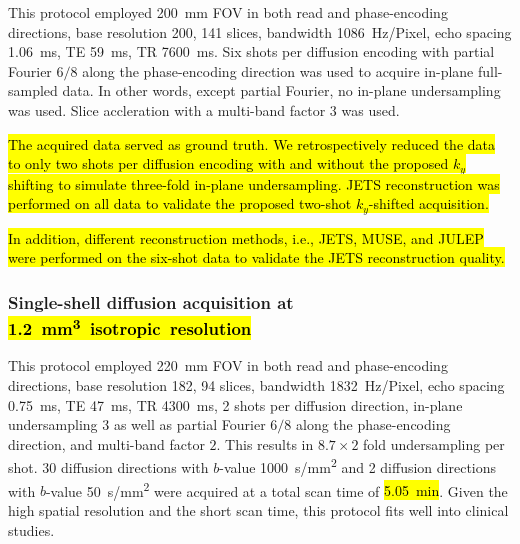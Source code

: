 \documentclass[preprint,12pt,authoryear,review]{elsarticle}
\begin{document}
    This protocol employed \SI{200}{\milli\meter} FOV
    in both read and phase-encoding directions,
    base resolution 200, 141 slices, bandwidth \SI{1086}{Hz/Pixel},
    echo spacing \SI{1.06}{ms}, TE \SI{59}{ms}, TR \SI{7600}{ms}.
    Six shots per diffusion encoding with partial Fourier $6/8$
    along the phase-encoding direction was used to
    acquire in-plane full-sampled data.
    In other words, except partial Fourier,
    no in-plane undersampling was used.
    Slice accleration with a multi-band factor $3$ was used.

    \hl{The acquired data served as ground truth.
    We retrospectively reduced the data to only two shots
    per diffusion encoding with and without the proposed $k_y$ shifting
    to simulate three-fold in-plane undersampling.
    JETS reconstruction was performed on all data to validate
    the proposed two-shot $k_y$-shifted acquisition.}

    \hl{In addition, different reconstruction methods,
    i.e., JETS, MUSE, and JULEP were performed on the six-shot data
    to validate the JETS reconstruction quality.}

    \subsubsection{Single-shell diffusion acquisition at \hl{\mbox{\SI{1.2}{\cubic\milli\meter} isotropic resolution}}} 
    \label{SEC:ACQ1.2mm}

    This protocol employed \SI{220}{\milli\meter} FOV in both read and phase-encoding directions,
    base resolution 182, 94 slices, bandwidth \SI{1832}{Hz/Pixel},
    echo spacing \SI{0.75}{ms}, TE \SI{47}{ms}, TR \SI{4300}{ms},
    2 shots per diffusion direction,
    in-plane undersampling $3$ as well as partial Fourier $6/8$ along the phase-encoding direction,
    and multi-band factor $2$. This results in $8.7 \times 2$ fold undersampling per shot.
    30 diffusion directions with $b$-value \SI{1000}{s/mm^2} and
    2 diffusion directions with $b$-value \SI{50}{s/mm^2} were acquired
    at a total scan time of \hl{\mbox{\SI{5.05}{\minute}}}. 
    Given the high spatial resolution and the short scan time,
    this protocol fits well into clinical studies.
\end{document}
